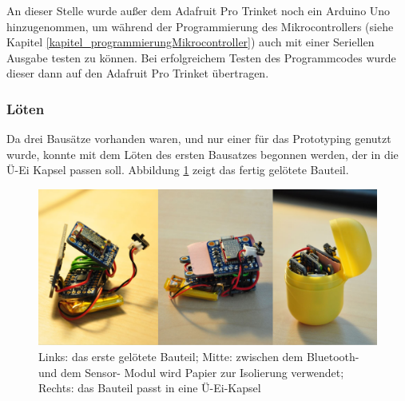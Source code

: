 An dieser Stelle wurde außer dem Adafruit Pro Trinket noch ein Arduino Uno hinzugenommen, um während der Programmierung des Mikrocontrollers (siehe Kapitel \ref{kapitel_programmierungMikrocontroller}) auch mit einer Seriellen Ausgabe testen zu können. Bei erfolgreichem Testen des Programmcodes wurde dieser dann auf den Adafruit Pro Trinket übertragen.

\subsubsection{Löten}

Da drei Bausätze vorhanden waren, und nur einer für das Prototyping genutzt wurde, konnte mit dem Löten des ersten Bausatzes begonnen werden, der in die Ü-Ei Kapsel passen soll.
Abbildung \ref{fig:k3_erstesBauteilGeloetet} zeigt das fertig gelötete Bauteil.

\begin{figure}[ht]
	\centering
	\includegraphics[width=1\textwidth]{images/k3-erstesBauteilGeloetet.jpg}
	\caption {Links: das erste gelötete Bauteil; Mitte: zwischen dem Bluetooth- und dem Sensor-
		Modul wird Papier zur Isolierung verwendet; Rechts: das Bauteil passt in eine Ü-Ei-Kapsel}
	\label{fig:k3_erstesBauteilGeloetet}
\end{figure}